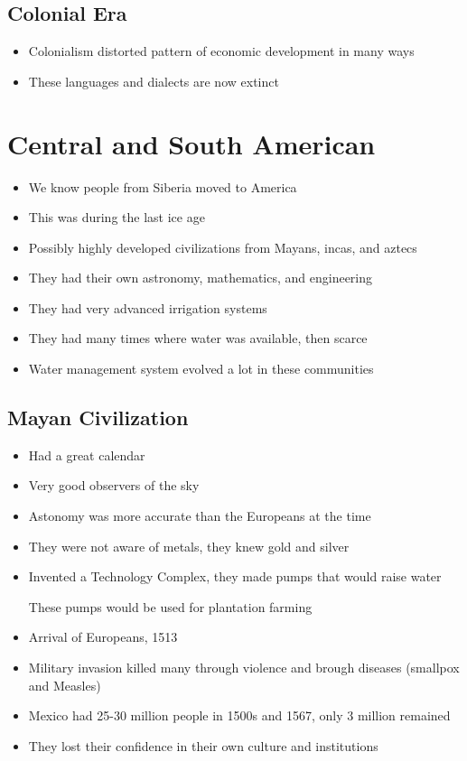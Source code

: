 \documentclass{article}
\begin{document}
\subsection{Colonial Era}
\begin{itemize}
  \item Colonialism distorted pattern of economic development in many ways
  \item These languages and dialects are now extinct
\end{itemize}

\section{Central and South American}
\begin{itemize}
  \item We know people from Siberia moved to America
  \item This was during the last ice age
  \item Possibly highly developed civilizations from
    Mayans, incas, and aztecs
  \item They had their own astronomy, mathematics, and engineering
  \item They had very advanced irrigation systems
  \item They had many times where water was available, then scarce
  \item Water management system evolved a lot in these communities
\end{itemize}

\subsection{Mayan Civilization}
\begin{itemize}
  \item Had a great calendar
  \item Very good observers of the sky
  \item Astonomy was more accurate than the Europeans at the time
  \item They were not aware of metals, they knew gold and silver
  \item Invented a Technology Complex, they made
    pumps that would raise water

    These pumps would be used for plantation farming
  \item Arrival of Europeans, 1513
  \item Military invasion killed many through violence and brough diseases (smallpox and Measles)
  \item Mexico had 25-30 million people in 1500s and 1567, only 3 million remained
  \item They lost their confidence in their own culture and institutions
\end{itemize}
\end{document}
